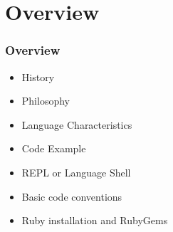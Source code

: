 


\section{Overview} 
\begin{frame}\frametitle{Overview} 
\begin{itemize}
\item History
\item Philosophy
\item Language Characteristics
\item Code Example
\item REPL or Language Shell
\item Basic code conventions
\item Ruby installation and RubyGems
\end{itemize}
\end{frame}


